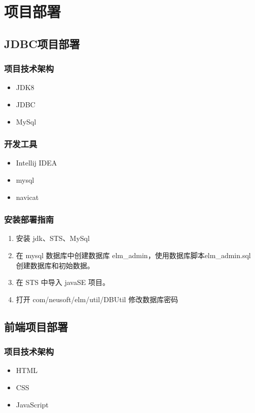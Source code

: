 
\chapter{项目部署}

\section{JDBC项目部署}


\subsection {项目技术架构}
    \begin{itemize}
        \item JDK8
        \item JDBC
        \item MySql
    \end{itemize}

\subsection {开发工具}
    \begin{itemize}
        \item Intellij IDEA
        \item mysql
        \item navicat
    \end{itemize}

\subsection {安装部署指南}
\begin{enumerate}
    \item 安装 jdk、STS、MySql
    \item 在 mysql 数据库中创建数据库 elm\_admin，使用数据库脚本elm\_admin.sql 创建数据库和初始数据。
    \item 在 STS 中导入 javaSE 项目。
    \item 打开 com/neusoft/elm/util/DBUtil 修改数据库密码
\end{enumerate}

\section{前端项目部署}

\subsection{项目技术架构}
    \begin{itemize}
        \item HTML
        \item CSS
        \item JavaScript
    \end{itemize}

